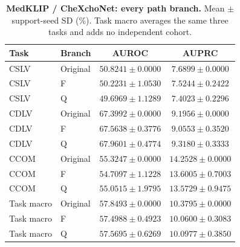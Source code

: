 \begin{table}[tp]
\centering
\caption{\textbf{MedKLIP / CheXchoNet: every path branch.} Mean $\pm$ support-seed SD (\%). Task macro averages the same three tasks and adds no independent cohort.}
\label{tab:supp-cardiac-path-medklip}
\small
\setlength{\tabcolsep}{4pt}
\begin{tabular*}{\textwidth}{@{\extracolsep{\fill}}llcc@{}}
\toprule
Task & Branch & AUROC & AUPRC \\
\midrule
CSLV & Original & $50.8241\pm0.0000$ & $7.6899\pm0.0000$ \\
CSLV & F & $50.2231\pm1.0530$ & $7.5244\pm0.2422$ \\
CSLV & Q & $49.6969\pm1.1289$ & $7.4023\pm0.2296$ \\
CDLV & Original & $67.3992\pm0.0000$ & $9.1956\pm0.0000$ \\
CDLV & F & $67.5638\pm0.3776$ & $9.0553\pm0.3520$ \\
CDLV & Q & $67.9601\pm0.4774$ & $9.3180\pm0.3333$ \\
CCOM & Original & $55.3247\pm0.0000$ & $14.2528\pm0.0000$ \\
CCOM & F & $54.7097\pm1.1228$ & $13.6005\pm0.7003$ \\
CCOM & Q & $55.0515\pm1.9795$ & $13.5729\pm0.9475$ \\
Task macro & Original & $57.8493\pm0.0000$ & $10.3795\pm0.0000$ \\
Task macro & F & $57.4988\pm0.4923$ & $10.0600\pm0.3083$ \\
Task macro & Q & $57.5695\pm0.6269$ & $10.0977\pm0.3850$ \\
\bottomrule
\end{tabular*}
\end{table}

